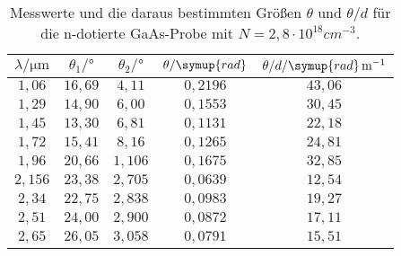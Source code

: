 \begin{table}
  \centering
  \caption{Messwerte und die daraus bestimmten Größen $\theta$ und $\theta/d$ für die n-dotierte GaAs-Probe
  mit $N=2,8 \cdot 10^{18} \si{cm}^{-3}$.}
  \begin{tabular}{c c c c c}
    \toprule
    $\lambda/\si{\micro\meter}$ & $\theta_{1}/\si{\degree}$ & $\theta_{2}/\si{\degree}$ & $\theta/\symup{rad}$ & $\theta/d/\symup{rad}\, \si{m}^{-1}$\\
    \midrule
    $1,06 $ & $16,69$ & $4,11$  & $0,2196$ & $43,06$ \\
    $1,29 $ & $14,90$ & $6,00$  & $0,1553$ & $30,45$ \\
    $1,45 $ & $13,30$ & $6,81$  & $0,1131$ & $22,18$ \\
    $1,72 $ & $15,41$ & $8,16$  & $0,1265$ & $24,81$ \\
    $1,96 $ & $20,66$ & $1,106$ & $0,1675$ & $32,85$ \\
    $2,156$ & $23,38$ & $2,705$ & $0,0639$ & $12,54$ \\
    $2,34 $ & $22,75$ & $2,838$ & $0,0983$ & $19,27$ \\
    $2,51 $ & $24,00$ & $2,900$ & $0,0872$ & $17,11$ \\
    $2,65 $ & $26,05$ & $3,058$ & $0,0791$ & $15,51$ \\
    \bottomrule
  \end{tabular}
\end{table}
